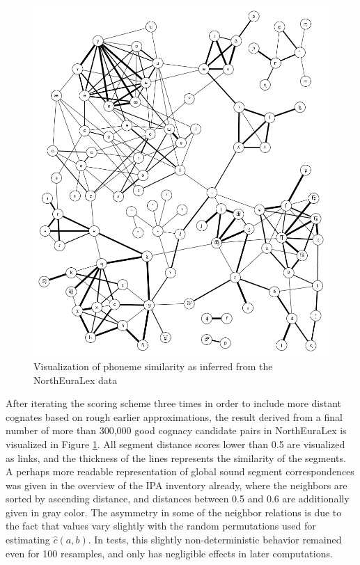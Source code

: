 \begin{figure}
    \includegraphics[width=\textwidth]{figures/phoneme-neighbor-graph.png}
    \caption{Visualization of phoneme similarity as inferred from the NorthEuraLex data}
    \label{fig:phonemDistGlobal}
\end{figure}

After iterating the scoring scheme three times in order to include more distant cognates based on rough earlier approximations, the result derived from a final number of more than 300,000 good cognacy candidate pairs in NorthEuraLex is visualized in Figure \ref{fig:phonemDistGlobal}. All segment distance scores lower than 0.5 are visualized as links, and the thickness of the lines represents the similarity of the segments. A perhaps more readable representation of global sound segment correspondences was given in the overview of the IPA inventory already, where the neighbors are sorted by ascending distance, and distances between 0.5 and 0.6 are additionally given in gray color. The asymmetry in some of the neighbor relations is due to the fact that values vary slightly with the random permutations used for estimating $\hat{c}(a,b)$. In tests, this slightly non-deterministic behavior remained even for 100 resamples, and only has negligible effects in later computations.

